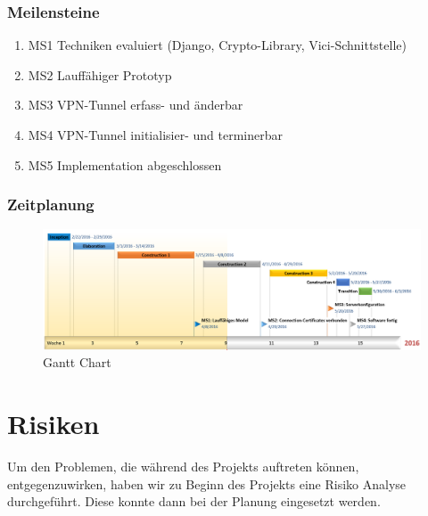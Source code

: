 \begin{landscape}
\subsubsection{Meilensteine}
\begin{enumerate}
	\item MS1 Techniken evaluiert (Django, Crypto-Library, Vici-Schnittstelle)
	\item MS2 Lauffähiger Prototyp
	\item MS3 VPN-Tunnel erfass- und änderbar
	\item MS4 VPN-Tunnel initialisier- und terminerbar
	\item MS5 Implementation abgeschlossen
\end{enumerate}
\subsubsection{Zeitplanung}
	\begin{figure}[H]
		\centering
		\includegraphics[width=250mm]{images/gantt.PNG}
		\caption{Gantt Chart}
	\end{figure}
\newpage
\section{Risiken}
Um den Problemen, die während des Projekts auftreten können, entgegenzuwirken, haben wir zu Beginn des Projekts eine Risiko Analyse durchgeführt. Diese konnte dann bei der Planung eingesetzt werden.


\end{landscape}
